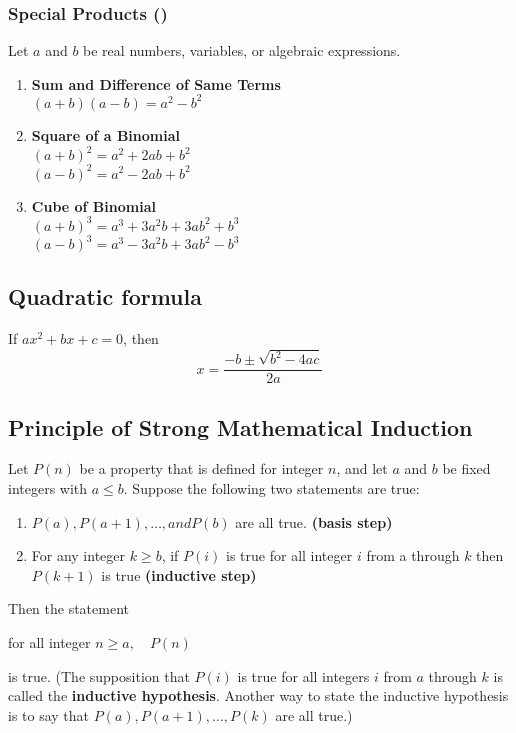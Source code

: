 \documentclass{rmutt-seminar}
\begin{document}
\subsubsection*{Special Products (\cite{EP95})}
Let $a$ and $b$ be real numbers, variables, or algebraic expressions.
\begin{enumerate}
	\item \textbf{Sum and Difference of Same Terms} \\
	\hspace*{0.4cm} $(a+b)(a-b) = a^2-b^2$
	\item \textbf{Square of a Binomial} \\
	\hspace*{0.4cm} $(a+b)^2 = a^2 +2ab+b^2$ \\
	\hspace*{0.4cm} $(a-b)^2 = a^2 -2ab+b^2$
	\item \textbf{Cube of Binomial} \\
	\hspace*{0.4cm} $(a+b)^3 = a^3+3a^2b+3ab^2+b^3$ \\
	\hspace*{0.4cm} $(a-b)^3 = a^3-3a^2b+3ab^2-b^3$
\end{enumerate}

\subsection{Quadratic formula}
	If $ ax^2 +bx + c = 0$, then 
\begin{equation*}\label{quadratic formula}
	x= \frac{-b \pm \sqrt{b^2 - 4ac}}{2a}
\end{equation*}
\subsection{Principle of Strong Mathematical Induction}
Let $P(n)$ be a property that is defined for integer $n$, and let $a$ and $b$ be fixed integers with $a \leq b$. Suppose the following two statements are true:
\begin{enumerate}
\item $P(a), P(a+1), \ldots, and P(b)$ are all true. \textbf{(basis step)}
\item For any integer $k \geq b$, if $P(i)$ is true for all integer $i$ from a through $k$ then $P(k+1)$ is true \textbf{(inductive step)}
\end{enumerate}
Then the statement
\begin{center}
for all integer $n \geq a, \quad P(n)$	
\end{center}
is true. (The supposition that $P(i)$ is true for all integers $i$ from $a$ through $k$ is called the \textbf{inductive hypothesis}. Another way to state the inductive hypothesis is to say that $P(a), P(a+1), \ldots, P(k)$ are all true.)
\end{document}
